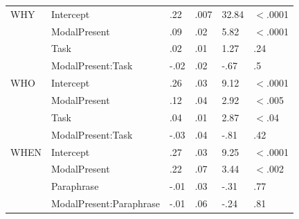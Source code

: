 \documentclass[12pt,letterpaper,table,svgnames,dvipsnames]{article}
\begin{document}
\begin{table}
\begin{center}
\begin{tabular}{l|lllll}
WHY & Intercept & .22 & .007 & 32.84 & $<$.0001\\
{} & ModalPresent & .09 & .02 & 5.82 & $<$.0001\\
{} & Task & .02 & .01 & 1.27 & .24\\
{} & ModalPresent:Task & -.02 & .02 & -.67 & .5\\
\bottomrule
\toprule
WHO & Intercept & .26 & .03 & 9.12 & $<$.0001\\
{} & ModalPresent & .12 & .04 & 2.92 & $<$.005\\
{} & Task & .04 & .01 & 2.87 & $<$.04\\
{} & ModalPresent:Task & -.03 & .04 & -.81 & .42\\
\bottomrule
\toprule
WHEN & Intercept & .27 & .03 & 9.25 & $<$.0001\\
{} & ModalPresent & .22 & .07 & 3.44 & $<$.002\\
{} & Paraphrase & -.01 & .03 & -.31 & .77\\
{} & ModalPresent:Paraphrase & -.01 & .06 & -.24 & .81\\
\bottomrule
\end{tabular} 
\end{center} 
\end{table}
\end{document}
